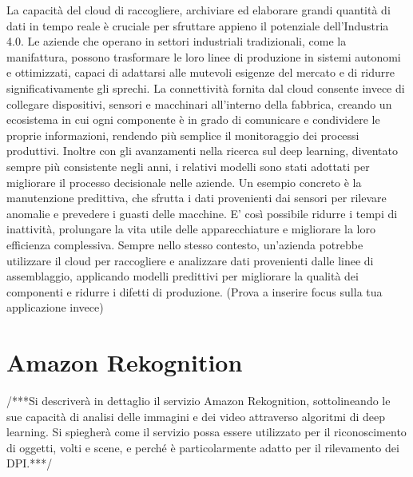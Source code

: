 La capacità del cloud di raccogliere, archiviare ed elaborare grandi quantità di dati in tempo reale è cruciale per sfruttare appieno il potenziale dell’Industria 4.0. Le aziende che operano in settori industriali tradizionali, come la manifattura, possono trasformare le loro linee di produzione in sistemi autonomi e ottimizzati, capaci di adattarsi alle mutevoli esigenze del mercato e di ridurre significativamente gli sprechi. La connettività fornita dal cloud consente invece di collegare dispositivi, sensori e macchinari all'interno della fabbrica, creando un ecosistema in cui ogni componente è in grado di comunicare e condividere le proprie informazioni, rendendo più semplice il monitoraggio dei processi produttivi. Inoltre con gli avanzamenti nella ricerca sul deep learning, diventato sempre più consistente negli anni, i relativi modelli sono stati adottati per migliorare il processo decisionale nelle aziende. Un esempio concreto è la manutenzione predittiva, che sfrutta i dati provenienti dai sensori per rilevare anomalie e prevedere i guasti delle macchine. E' così possibile ridurre i tempi di inattività, prolungare la vita utile delle apparecchiature e migliorare la loro efficienza complessiva. Sempre nello stesso contesto, un'azienda potrebbe utilizzare il cloud per raccogliere e analizzare dati provenienti dalle linee di assemblaggio, applicando modelli predittivi per migliorare la qualità dei componenti e ridurre i difetti di produzione. (Prova a inserire focus sulla tua applicazione invece)

\section{Amazon Rekognition}

/***Si descriverà in dettaglio il servizio Amazon Rekognition, sottolineando le sue capacità di analisi delle immagini e dei video attraverso algoritmi di deep learning. Si spiegherà come il servizio possa essere utilizzato per il riconoscimento di oggetti, volti e scene, e perché è particolarmente adatto per il rilevamento dei DPI.***/

